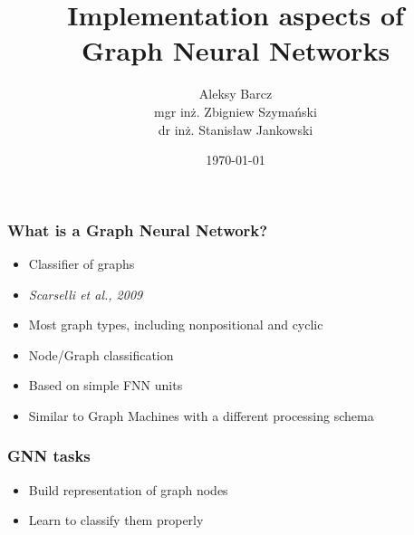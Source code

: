\documentclass{beamer}
\author{Aleksy Barcz\\mgr inż. Zbigniew Szymański\\ dr inż. Stanisław Jankowski}
\title{Implementation aspects of\\Graph Neural Networks}
\date{\today}
\institute{Warsaw University of Technology}
\begin{document}
\frame{\titlepage}

\begin{frame}
\frametitle{What is a Graph Neural Network?}
\begin{itemize}
	\item Classifier of graphs
	\item \emph{Scarselli et al., 2009}
	\item Most graph types, including nonpositional and cyclic
	\item Node/Graph classification
	\item Based on simple FNN units
	\item Similar to Graph Machines with a different processing schema
\end{itemize}
\end{frame}

\begin{frame}
\frametitle{GNN tasks}
\begin{itemize}
	\item Build representation of graph nodes
	\item Learn to classify them properly
\end{itemize}
\end{frame}
\end{document}
